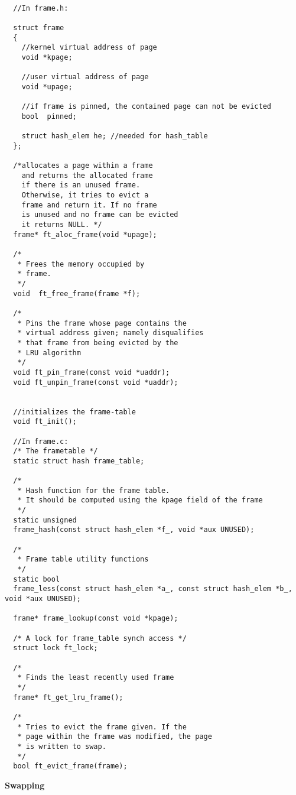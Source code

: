 \begin{lstlisting}

  //In frame.h:

  struct frame
  {
	//kernel virtual address of page
	void *kpage; 	
	  
	//user virtual address of page
	void *upage;	
	
	//if frame is pinned, the contained page can not be evicted
	bool  pinned;		
	
	struct hash_elem he; //needed for hash_table
  };

  /*allocates a page within a frame
    and returns the allocated frame
    if there is an unused frame.
    Otherwise, it tries to evict a 
    frame and return it. If no frame
    is unused and no frame can be evicted
    it returns NULL. */
  frame* ft_aloc_frame(void *upage);

  /*
   * Frees the memory occupied by
   * frame.
   */
  void 	ft_free_frame(frame *f);  

  /*
   * Pins the frame whose page contains the
   * virtual address given; namely disqualifies 
   * that frame from being evicted by the 
   * LRU algorithm
   */
  void ft_pin_frame(const void *uaddr);
  void ft_unpin_frame(const void *uaddr);


  //initializes the frame-table
  void ft_init();

  //In frame.c:
  /* The frametable */
  static struct hash frame_table;

  /* 
   * Hash function for the frame table.
   * It should be computed using the kpage field of the frame 
   */
  static unsigned 
  frame_hash(const struct hash_elem *f_, void *aux UNUSED);
  
  /* 
   * Frame table utility functions
   */
  static bool 
  frame_less(const struct hash_elem *a_, const struct hash_elem *b_, void *aux UNUSED);
  
  frame* frame_lookup(const void *kpage);

  /* A lock for frame_table synch access */
  struct lock ft_lock;

  /*
   * Finds the least recently used frame
   */
  frame* ft_get_lru_frame();
  
  /* 
   * Tries to evict the frame given. If the 
   * page within the frame was modified, the page
   * is written to swap. 
   */
  bool ft_evict_frame(frame);

\end{lstlisting}

\textbf{Swapping}

